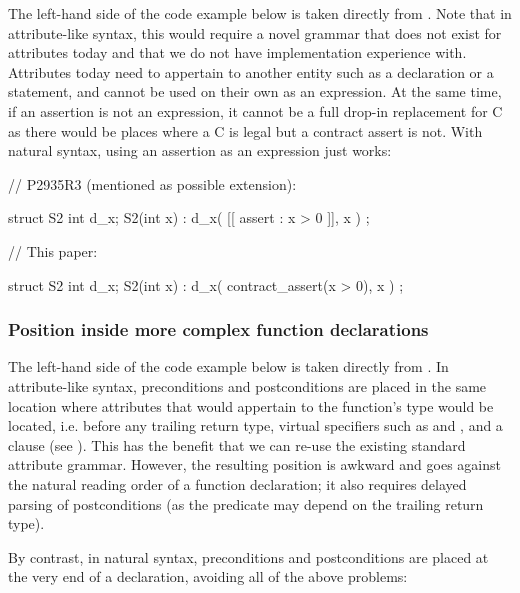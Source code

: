 The left-hand side of the code example below is taken directly from \cite{P2935R3}. Note that in attribute-like syntax, this would require a novel grammar that does not exist for attributes today and that we do not have implementation experience with. Attributes today need to appertain to another entity such as a declaration or a statement, and cannot be used on their own as an expression. At the same time, if an assertion is not an expression, it cannot be a full drop-in replacement for C  as there would be places where a C  is legal but a contract assert is not. With natural syntax, using an assertion as an expression just works:

\begin{minipage}{8cm}
\begin{codeblock}
// P2935R3 (mentioned as possible extension):

struct S2 {
  int d_x;
  S2(int x)
    : d_x( [[ assert : x > 0 ]], x )
  {}
};
\end{codeblock}
\end{minipage}
\begin{minipage}{8cm}
\begin{codeblock}
// This paper:

struct S2 {
  int d_x;
  S2(int x)
    : d_x( contract_assert(x > 0), x )
  {}
};
\end{codeblock}
\end{minipage}

\subsubsection{Position inside more complex function declarations}

The left-hand side of the code example below is taken directly from \cite{P2935R3}. In attribute-like syntax, preconditions and postconditions are placed in the same location where attributes that would appertain to the function’s type would be located, i.e. before any trailing return type, virtual specifiers such as  and , and a  clause (see \cite{P2935R3}). This has the benefit that we can re-use the existing standard attribute grammar. However, the resulting position is awkward and goes against the natural reading order of a function declaration; it also requires delayed parsing of postconditions (as the predicate may depend on the trailing return type).

By contrast, in natural syntax, preconditions and postconditions are placed at the very end of a declaration, avoiding all of the above problems:

